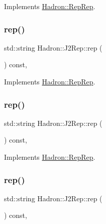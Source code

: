 Implements \mbox{\hyperlink{structHadron_1_1RepRep_ab3213025f6de249f7095892109575fde}{Hadron\+::\+Rep\+Rep}}.

\mbox{\label{structHadron_1_1J2Rep_ae377be8f84efb218c8a07db0d4d5bb01}} 
\subsubsection{\texorpdfstring{rep()}{rep()}\hspace{0.1cm}{\footnotesize\ttfamily [2/5]}}
{\footnotesize\ttfamily std\+::string Hadron\+::\+J2\+Rep\+::rep (\begin{DoxyParamCaption}{ }\end{DoxyParamCaption}) const\hspace{0.3cm}{\ttfamily [inline]}, {\ttfamily [virtual]}}



Implements \mbox{\hyperlink{structHadron_1_1RepRep_ab3213025f6de249f7095892109575fde}{Hadron\+::\+Rep\+Rep}}.

\mbox{\label{structHadron_1_1J2Rep_ae377be8f84efb218c8a07db0d4d5bb01}} 
\subsubsection{\texorpdfstring{rep()}{rep()}\hspace{0.1cm}{\footnotesize\ttfamily [3/5]}}
{\footnotesize\ttfamily std\+::string Hadron\+::\+J2\+Rep\+::rep (\begin{DoxyParamCaption}{ }\end{DoxyParamCaption}) const\hspace{0.3cm}{\ttfamily [inline]}, {\ttfamily [virtual]}}



Implements \mbox{\hyperlink{structHadron_1_1RepRep_ab3213025f6de249f7095892109575fde}{Hadron\+::\+Rep\+Rep}}.

\mbox{\label{structHadron_1_1J2Rep_ae377be8f84efb218c8a07db0d4d5bb01}} 
\subsubsection{\texorpdfstring{rep()}{rep()}\hspace{0.1cm}{\footnotesize\ttfamily [4/5]}}
{\footnotesize\ttfamily std\+::string Hadron\+::\+J2\+Rep\+::rep (\begin{DoxyParamCaption}{ }\end{DoxyParamCaption}) const\hspace{0.3cm}{\ttfamily [inline]}, {\ttfamily [virtual]}}



